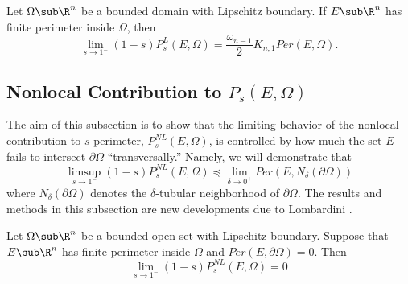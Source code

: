 \documentclass[../main.tex]{subfiles}
\begin{document}
\begin{proposition}\label{localsto1}
    Let $ \Omega\sub \R^{n} $ be a bounded domain with Lipschitz boundary. If $ E\sub \R^{n} $ has finite perimeter inside $ \Omega $, then
    \[
        \lim_{s\to1^{-}}(1-s)P_{s}^{L}(E,\Omega) = \frac{\omega_{n-1}}{2}K_{n,1}Per(E,\Omega).
    \]
\end{proposition}

\subsection{Nonlocal Contribution to $ P_{s}(E,\Omega) $}

The aim of this subsection is to show that the limiting behavior of the nonlocal contribution to $ s $-perimeter, $ P_{s}^{NL}(E,\Omega) $, is controlled by how much the set $ E $ fails to intersect $ \partial \Omega $ ``transversally.'' Namely, we will demonstrate that
\[
    \limsup_{s\to1^{-}}(1-s)P_{s}^{NL}(E,\Omega) \preceq \lim_{\delta\to0^{+}}Per(E,N_{\delta}(\partial \Omega))
\]
where $ N_{\delta}(\partial \Omega) $ denotes the $ \delta $-tubular neighborhood of $ \partial \Omega $. The results and methods in this subsection are new developments due to Lombardini \cite{lombardini:2019}.






\begin{theorem}
    Let $ \Omega\sub \R^{n} $ be a bounded open set with Lipschitz boundary. Suppose that $ E\sub \R^{n} $ has finite perimeter inside $ \Omega $ and $ Per(E,\partial \Omega) = 0 $. Then 
    \[
        \lim_{s\to1^{-}}(1-s) P_{s}^{NL}(E,\Omega) = 0 
    \]
\end{theorem}

\begin{wrapfigure}{r}{0.5\textwidth}
    \begin{center}
    
    \end{center}
    \vspace{-10mm}
\end{wrapfigure}
\end{document}

